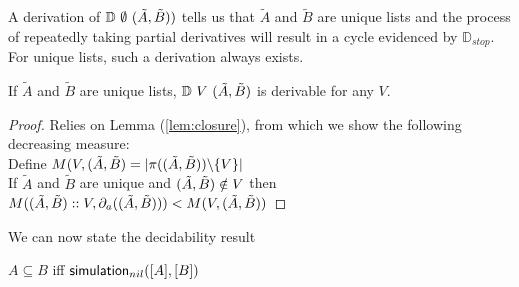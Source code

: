 A derivation of $\mathbb{D}~\emptyset~(\tilde{A},\tilde{B}))$ tells us that $\tilde{A}$ and $\tilde{B}$ are unique lists and the process of repeatedly taking partial derivatives will result in a cycle evidenced by $\mathbb{D}_{stop}$. For unique lists, such a derivation always exists.
\begin{lemma}
If $\tilde{A}$ and $\tilde{B}$ are unique lists, $\mathbb{D}~{V}~(\tilde{A},\tilde{B})$ is derivable for any $V$.
\end{lemma}
\begin{proof}
Relies on Lemma (\ref{lem:closure}), from which we show the following decreasing measure:\\
Define $M(V,(\tilde{A},\tilde{B}) = |\pi((\tilde{A},\tilde{B})) \backslash \{V\}|  $ \\
If $\tilde{A}$ and $\tilde{B}$ are unique and $(\tilde{A},\tilde{B}) \notin V$ then $M((\tilde{A},\tilde{B})::V,\partial_{a}((\tilde{A},\tilde{B}))) <  M(V,(\tilde{A},\tilde{B})) $
\end{proof}
We can now state the decidability result
\begin{lemma}\label{lem:dec}
$A \subseteq B$ iff $\mathsf{simulation}_{nil}([A],[B])$
\end{lemma}

